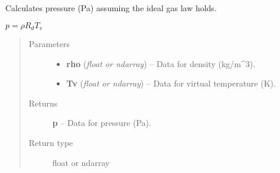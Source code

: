 \documentclass[letterpaper,10pt,english]{sphinxmanual}
\begin{document}
\begin{fulllineitems}
\label{atmos:atmos.equations.p_from_rho_Tv_ideal_gas}
Calculates pressure (Pa) assuming the ideal gas law holds.

\(p = \rho R_d T_v\)
\begin{quote}\begin{description}
\item[{Parameters}] \leavevmode\begin{itemize}
\item {} 
\textbf{rho} (\emph{float or ndarray}) -- Data for density (kg/m\textasciicircum{}3).

\item {} 
\textbf{Tv} (\emph{float or ndarray}) -- Data for virtual temperature (K).

\end{itemize}

\item[{Returns}] \leavevmode
\textbf{p} --
Data for pressure (Pa).

\item[{Return type}] \leavevmode
float or ndarray

\end{description}\end{quote}

\end{fulllineitems}

\end{document}
